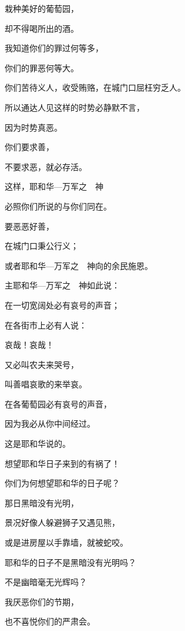 {\par }{\Q 栽种美好的葡萄园，
\par }{\Q 却不得喝所出的酒。
\par }{\Q {}我知道你们的罪过何等多，
\par }{\Q 你们的罪恶何等大。
\par }{\Q 你们苦待义人，收受贿赂，在城门口屈枉穷乏人。
\par }{\Q {}所以通达人见这样的时势必静默不言，
\par }{\Q 因为时势真恶。
\par }{\BB \par }{\Q {}你们要求善，
\par }{\Q 不要求恶，就必存活。
\par }{\Q 这样，耶和华—万军之　神
\par }{\Q 必照你们所说的与你们同在。
\par }{\Q {}要恶恶好善，
\par }{\Q 在城门口秉公行义；
\par }{\Q 或者耶和华—万军之　神向{}的余民施恩。
\par }{\BB \par }{\Q {}主耶和华—万军之　神如此说：
\par }{\Q 在一切宽阔处必有哀号的声音；
\par }{\Q 在各街市上必有人说：
\par }{\Q 哀哉！哀哉！
\par }{\Q 又必叫农夫来哭号，
\par }{\Q 叫善唱哀歌的来举哀。
\par }{\Q {}在各葡萄园必有哀号的声音，
\par }{\Q 因为我必从你中间经过。
\par }{\Q 这是耶和华说的。
\par }{\BB \par }{\Q {}想望耶和华日子来到的有祸了！
\par }{\Q 你们为何想望耶和华的日子呢？
\par }{\Q 那日黑暗没有光明，
\par }{\Q {}景况好像人躲避狮子又遇见熊，
\par }{\Q 或是进房屋以手靠墙，就被蛇咬。
\par }{\Q {}耶和华的日子不是黑暗没有光明吗？
\par }{\Q 不是幽暗毫无光辉吗？
\par }{\BB \par }{\Q {}我厌恶你们的节期，
\par }{\Q 也不喜悦你们的严肃会。
}
